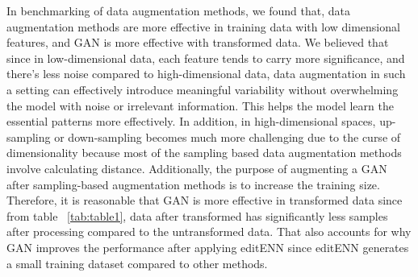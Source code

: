In benchmarking of data augmentation methods, we found that, data augmentation methods are more effective in training data with low dimensional features, and GAN is more effective with transformed data. We believed that since in low-dimensional data, each feature tends to carry more significance, and there's less noise compared to high-dimensional data, data augmentation in such a setting can effectively introduce meaningful variability without overwhelming the model with noise or irrelevant information. This helps the model learn the essential patterns more effectively. In addition, in high-dimensional spaces, up-sampling or down-sampling becomes much more challenging due to the curse of dimensionality because most of the sampling based data augmentation methods involve calculating distance. Additionally, the purpose of augmenting a GAN after sampling-based augmentation methods is to increase the training size. Therefore, it is reasonable that GAN is more effective in transformed data since from table ~\ref{tab:table1}, data after transformed has significantly less samples after processing compared to the untransformed data. That also accounts for why GAN improves the performance after applying editENN since editENN generates a small training dataset compared to other methods. 